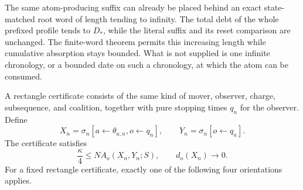 \documentclass[11pt]{article}
\begin{document}
The same atom-producing suffix can already be placed behind an exact
state-matched root word of length tending to infinity.  The total debt of the
whole prefixed profile tends to $D_*$, while the literal suffix and its reset
comparison are unchanged.  The finite-word theorem permits this increasing
length while cumulative absorption stays bounded.  What is not supplied is
one infinite chronology, or a bounded date on such a chronology, at which the
atom can be consumed.

A rectangle certificate consists of the same kind of mover, observer, charge,
subsequence, and coalition, together with pure stopping times $q_n$ for the
observer.  Define
\[
 X_n=\sigma_n[a\leftarrow\theta_{a,n},o\leftarrow q_n],
 \qquad
 Y_n=\sigma_n[o\leftarrow q_n].
\]
The certificate satisfies
\[
 \frac{\kappa}{4}\le N A_o(X_n,Y_n;S),
 \qquad d_o(X_n)\longrightarrow0.
\]
For a fixed rectangle certificate, exactly one of the following four
orientations applies.
\end{document}
